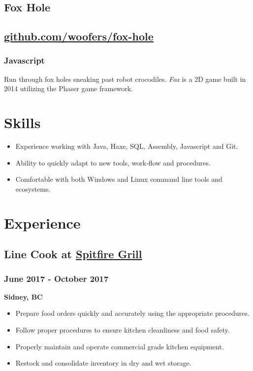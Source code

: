 \documentclass[letterpaper]{article}
\begin{document}
\subsection{Fox Hole}
\label{sec-1-7}
\subsection{\href{https://github.com/woofers/fox-hole}{github.com/woofers/fox-hole}}
\label{sec-1-8}
\subsubsection{Javascript}
\label{sec-1-8-1}
Run through fox holes sneaking past robot crocodiles.
\emph{Fox} is a 2D game built in 2014 utilizing the Phaser game framework.
\section{Skills}
\label{sec-2}
\begin{itemize}
\item Experience working with Java, Haxe, SQL, Assembly, Javascript and Git.
\item Ability to quickly adapt to new tools, work-flow and procedures.
\item Comfortable with both Windows and Linux command line tools and ecosystems.
\end{itemize}
\section{Experience}
\label{sec-3}
\subsection{Line Cook at \href{https://www.spitfiregrill.ca/}{Spitfire Grill}}
\label{sec-3-1}
\subsubsection{June 2017 - October 2017}
\label{sec-3-1-1}
\textbf{Sidney, BC}
\begin{itemize}
\item Prepare food orders quickly and accurately using the appropriate procedures.
\item Follow proper procedures to ensure kitchen cleanliness and food safety.
\item Properly maintain and operate commercial grade kitchen equipment.
\item Restock and consolidate inventory in dry and wet storage.
\end{itemize}
\end{document}
